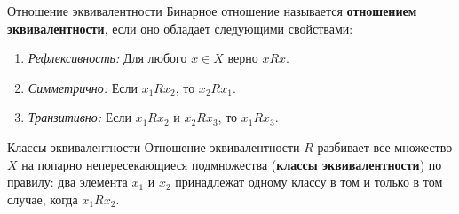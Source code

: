 \begin{definition}{Отношение эквивалентности}{}
    Бинарное отношение называется \textbf{отношением эквивалентности},
    если оно обладает следующими свойствами:
    \begin{enumerate}
        \item \textit{Рефлексивность:} Для любого $x \in X$ верно $x R x$.
        \item \textit{Симметрично:} Если $x_1 R x_2$, то $x_2 R x_1$.
        \item \textit{Транзитивно:} Если $x_1 R x_2$ и $x_2 R x_3$, то $x_1 R x_3$.
    \end{enumerate}
\end{definition}

\begin{theorem}{Классы эквивалентности}{}
    Отношение эквивалентности $R$ разбивает все множество $X$
    на попарно непересекающиеся подмножества (\textbf{классы эквивалентности}) по правилу:
    два элемента $x_1$ и $x_2$ принадлежат одному классу в том и только в том случае, когда $x_1 R x_2$.
\end{theorem}
